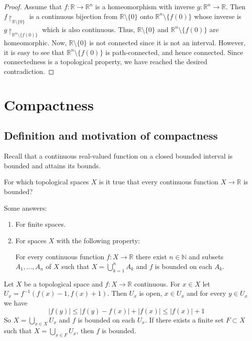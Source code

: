 \documentclass[a4paper,11pt]{article}
\begin{document}
\begin{proof}
    Assume that $f: \mathbb{R} \rightarrow \mathbb{R}^{n}$ is a homeomorphism with inverse $g: \mathbb{R}^{n} \rightarrow \mathbb{R}$. Then $f\restriction_{\mathbb{R} \setminus\{0\}}$ is a continuous bijection from $\mathbb{R} \setminus\{0\}$ onto $\mathbb{R}^{n} \setminus\{f(0)\}$ whose inverse is $g\restriction_{\mathbb{R}^{n} \setminus\{f(0)\}}$ which is also continuous. Thus, $\mathbb{R} \setminus\{0\}$ and $\mathbb{R}^{n} \setminus\{f(0)\}$ are homeomorphic. Now, $\mathbb{R} \setminus\{0\}$ is not connected since it is not an interval. However, it is easy to see that $\mathbb{R}^{n} \setminus\{f(0)\}$ is path-connected, and hence connected. Since connectedness is a topological property, we have reached the desired contradiction.
\end{proof}

\section{Compactness}
\subsection{Definition and motivation of compactness}
Recall that a continuous real-valued function on a closed bounded interval is bounded and attains its bounds.

\begin{sque}
    For which topological spaces $X$ is it true that every continuous function $X \rightarrow \mathbb{R}$ is bounded?
\end{sque}

Some answers:

\begin{enumerate}
  \item For finite spaces.

  \item For spaces $X$ with the following property:

  For every continuous function $f: X \rightarrow \mathbb{R}$ there exist $n \in \mathbb{N}$ and subsets $A_{1}, \ldots, A_{n}$ of $X$ such that $X=\bigcup_{k=1}^{n} A_{k}$ and $f$ is bounded on each $A_{k}$.
\end{enumerate}

\begin{note}
    Let $X$ be a topological space and $f: X \rightarrow \mathbb{R}$ continuous. For $x \in X$ let $U_{x}=f^{-1}(f(x)-1, f(x)+1)$. Then $U_{x}$ is open, $x \in U_{x}$ and for every $y \in U_{x}$ we have
    $$
    |f(y)| \leqslant|f(y)-f(x)|+|f(x)| \leqslant|f(x)|+1
    $$
    So $X=\bigcup_{x \in X} U_{x}$ and $f$ is bounded on each $U_{x}$. If there exists a finite set $F \subset X$ such that $X=\bigcup_{x \in F} U_{x}$, then $f$ is bounded.
\end{note}
\end{document}
